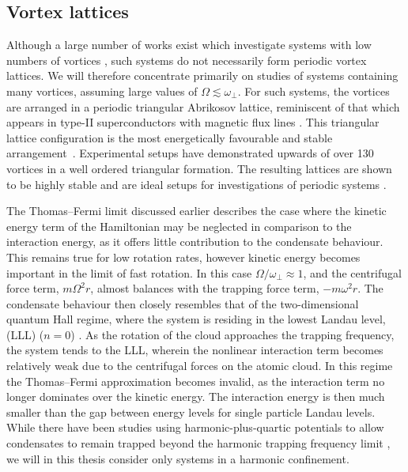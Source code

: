 \subsection{Vortex lattices}\label{sec:sec2_vtxlatt}

Although a large number of works exist which investigate systems with low numbers of vortices \cite{THS:Davies_2000,Vtx:Chevy_prl_2000,Vtx:Cooper_prl_2001,Vtx:Rosenbusch_prl_2002,Vtx:Ogawa_pra_2002,Vtx:Bretin_joptb_2003,Vtx:Madison_prl_2000,Vtx:Madison_jmo_2000,Vtx:Chevy_aoi_2001,Vtx:Madison_prl_2001,Vtx:Mottonen_jpcm_2002}, such systems do not necessarily form periodic vortex lattices. We will therefore concentrate primarily on studies of systems containing many vortices, assuming large values of $\Omega \lesssim \omega_\perp$. For such systems, the vortices are arranged in a periodic triangular Abrikosov lattice, reminiscent of that which appears in type-II superconductors with magnetic flux lines \cite{Vtx:AboShaeer_sci_2001}. This triangular lattice configuration is the most energetically favourable and stable arrangement~\cite{Tkachenko}. Experimental setups have demonstrated upwards of over 130 vortices in a well ordered triangular formation. The resulting lattices are shown to be highly stable and are ideal setups for investigations of periodic systems \cite{Vtx:AboShaeer_sci_2001,Vtx:Engels_prl_2002}.

The Thomas--Fermi limit discussed earlier describes the case where the kinetic energy term of the Hamiltonian may be neglected in comparison to the interaction energy, as it offers little contribution to the condensate behaviour. This remains true for low rotation rates, however kinetic energy becomes important in the limit of fast rotation. In this case $\Omega/\omega_{\perp}\approx 1$, and the centrifugal force term, $m\Omega^2r$, almost balances with the trapping force term, $-m\omega^2r$. The condensate behaviour then closely resembles that of the two-dimensional quantum Hall regime, where the system is residing in the lowest Landau level, (LLL) ($n=0$) \cite{Vtx:Ho_prl_2001}.  As the rotation of the cloud approaches the trapping frequency, the system tends to the LLL, wherein the nonlinear interaction term becomes relatively weak due to the centrifugal forces on the atomic cloud. In this regime the Thomas--Fermi approximation becomes invalid, as the interaction term no longer dominates over the kinetic energy. The interaction energy is then much smaller than the gap between energy levels for single particle Landau levels. While there have been studies using harmonic-plus-quartic potentials to allow condensates to remain trapped beyond the harmonic trapping frequency limit \cite{BEC:Bretin_prl_2004,Vtx:Ghosh_pra_2004}, we will in this thesis consider only systems in a harmonic confinement.

